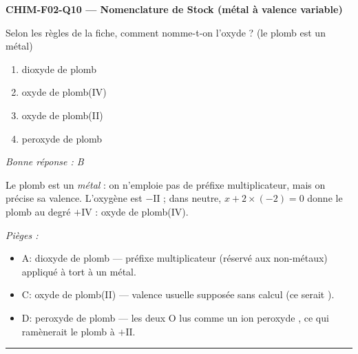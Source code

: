 \documentclass[11pt,a4paper]{article}
\begin{document}
\noindent\textbf{CHIM-F02-Q10 --- Nomenclature de Stock (métal à valence variable)}\par
Selon les règles de la fiche, comment nomme-t-on l'oxyde  ? (le plomb est un métal)
\begin{enumerate}[label=\Alph*)]
\item dioxyde de plomb
\item oxyde de plomb(IV)
\item oxyde de plomb(II)
\item peroxyde de plomb
\end{enumerate}
\textit{Bonne réponse : B}\par
Le plomb est un \emph{métal} : on n'emploie pas de préfixe multiplicateur, mais on précise sa valence. L'oxygène est $-\mathrm{II}$ ; dans  neutre, $x + 2\times(-2) = 0$ donne le plomb au degré $+\mathrm{IV}$ : oxyde de plomb(IV).\par
\textit{Pièges :}
\begin{itemize}
\item A: dioxyde de plomb --- préfixe multiplicateur (réservé aux non-métaux) appliqué à tort à un métal.
\item C: oxyde de plomb(II) --- valence usuelle  supposée sans calcul (ce serait ).
\item D: peroxyde de plomb --- les deux O lus comme un ion peroxyde , ce qui ramènerait le plomb à $+\mathrm{II}$.
\end{itemize}
\vspace{8pt}\hrule\vspace{8pt}
\end{document}
